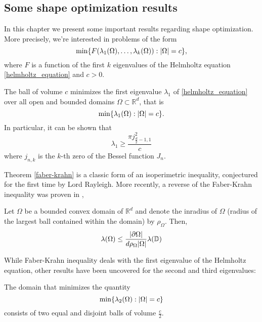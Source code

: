 \subsection*{Some shape optimization results}

In this chapter we present some important results regarding shape optimization. More precisely, we're interested in problems of the form
\begin{equation}\label{shape_prob}
    \min\{F(\lambda_1(\Omega),\dots, \lambda_k(\Omega)): \abs{\Omega} = c\},
\end{equation}
where \(F\) is a function of the first \(k\) eigenvalues of the Helmholtz equation \eqref{helmholtz_equation} and \(c > 0\).

\begin{theorem}\label{faber-krahn}
    The ball of volume \(c\) minimizes the first eigenvalue \(\lambda_1\) of \eqref{helmholtz_equation} over all open and bounded domains \(\Omega \subset \mathbb{R}^d\), that is
    \[
    \min\{\lambda_1(\Omega): \abs{\Omega} = c\}.
    \]
    In particular, it can be shown that
    \[
    \lambda_1 \geq \frac{\pi j_{\frac{d}{2}-1,1}^2}{c}    
    \]
    where \(j_{n, k}\) is the \(k\)-th zero of the Bessel function \(J_n\).
\end{theorem}

Theorem \ref*{faber-krahn} is a classic form of an isoperimetric inequality, conjectured for the first time by Lord Rayleigh. More recently, a reverse of the Faber-Krahn inequality was proven in \cite{freitas2008sharp},
\begin{theorem}\label{reverse_faber-krahn}
    Let \(\Omega\) be a bounded convex domain of \(\mathbb{R}^d\) and denote the inradius of \(\Omega\) (radius of the largest ball contained within the domain) by \(\rho_\Omega\). Then,
    \[
    \lambda(\Omega) \leq \frac{\abs{\partial \Omega}}{d \rho_\Omega \abs{\Omega}} \lambda(\mathbb{D})
    \]
\end{theorem}   

While Faber-Krahn inequality deals with the first eigenvalue of the Helmholtz equation, other results have been uncovered for the second and third eigenvalues:

\begin{theorem}
    The domain that minimizes the quantity
    \[
    \min\{\lambda_2(\Omega): \abs{\Omega} = c\}
    \]
    consists of two equal and disjoint balls of volume \(\frac{c}{2}\).
\end{theorem}

